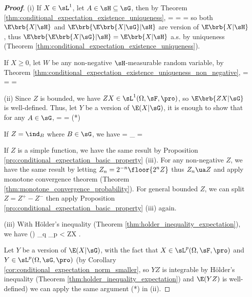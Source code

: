 \begin{proof}[\bf Proof]
\ben
\item [(i)] If $X\in \sL^1$, let $A \in \sH\subseteq \sG$, then by Theorem \ref{thm:conditional_expectation_existence_uniqueness},
\be
\E{} = \E{} = \E{} = \E{}
\ee
so both $\E\brb{X |\sH}$ and $\E\brb{\E\brb{X |\sG} |\sH}$ are version of $\E\brb{X |\sH}$, thus $\E\brb{\E\brb{X |\sG} |\sH} = \E\brb{X |\sH}$ a.s. by uniqueness (Theorem \ref{thm:conditional_expectation_existence_uniqueness}).

If $X\geq 0$, let $W$ be any non-negative $\sH$-measurable random variable, by Theorem \ref{thm:conditional_expectation_existence_uniqueness_non_negative},
\be
\E{} = \E{} = \E{} = \E{}
\ee

\item [(ii)] Since $Z$ is bounded, we have $ZX\in \sL^1(\Omega,\sF,\pro)$, so $\E\brb{ZX|\sG}$ is well-defined. Thus, let $Y$ be a version of $\E(X|\sG)$, it is enough to show that for any $A\in \sG$,
\be
\E{} = \E {}  \E {} = \E{} \quad \quad(*)
\ee

If $Z = \ind_B$ where $B\in \sG$, we have
\be
\E {} = _{} = \E {}
\ee

If $Z$ is a simple function, we have the same result by Proposition \ref{pro:conditional_expectation_basic_property} (iii). For any non-negative $Z$, we have the same result by letting $Z_n = 2^{-n}\floor{2^n Z}$ thus $Z_n \ua Z$ and apply monotone convergence theorem (Theorem \ref{thm:monotone_convergence_probability}). For general bounded $Z$, we can split $Z = Z^+ - Z^-$ then apply Proposition \ref{pro:conditional_expectation_basic_property} (iii) again.

\item [(iii)] With H\"older's inequality (Theorem \ref{thm:holder_inequality_expectation}), we have
\be
\E() \leq {}_q _p < \infty \quad\ra\quad ZX .
\ee

Let $Y$ be a version of $\E(X|\sG)$, with the fact that $X\in \sL^p(\Omega,\sF,\pro)$ and $Y\in \sL^p(\Omega,\sG,\pro)$ (by Corollary \ref{cor:conditional_expectation_norm_smaller}, so $YZ$ is integrable by H\"older's inequality (Theorem \ref{thm:holder_inequality_expectation}) and $\E(YZ)$ is well-defined) we can apply the same argument (*) in (ii).


\end{proof}
